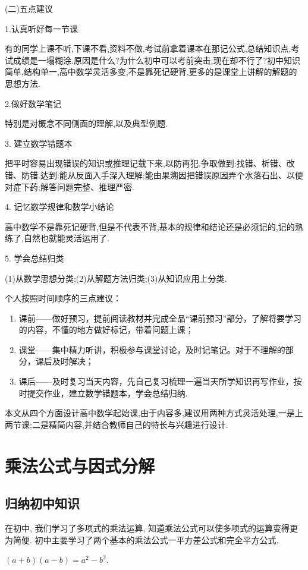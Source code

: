 (二)五点建议

1.认真听好每一节课

有的同学上课不听,下课不看,资料不做,考试前拿着课本在那记公式,总结知识点,考试成绩是一塌糊涂.原因是什么?为什么初中可以考前突击,现在却不行了?初中知识简单,结构单一,高中数学灵活多变,不是靠死记硬背,更多的是课堂上讲解的解题的思想方法.

2.做好数学笔记

特别是对概念不同侧面的理解,以及典型例题.

3. 建立数学错题本

把平时容易出现错误的知识或推理记载下来,以防再犯.争取做到:找错、析错、改错、防错.达到:能从反面入手深入理解;能由果溯因把错误原因弄个水落石出、以便对症下药;解答问题完整、推理严密.

4. 记忆数学规律和数学小结论

高中数学不是靠死记硬背,但是不代表不背,基本的规律和结论还是必须记的,记的熟练了,自然也就能灵活运用了.

5. 学会总结归类

(1)从数学思想分类;(2)从解题方法归类;(3)从知识应用上分类.

\begin{note}
	个人按照时间顺序的三点建议：
	\begin{enumerate}
		\item     课前——做好预习，提前阅读教材并完成全品“课前预习”部分，了解将要学习的内容，不懂的地方做好标记，带着问题上课；
		\item 课堂——集中精力听讲，积极参与课堂讨论，及时记笔记。对于不理解的部分，课后及时解决；
		\item 课后——及时复习当天内容，先自己复习梳理一遍当天所学知识再写作业，按时提交作业，建立数学错题本，学会总结归纳.
	\end{enumerate}
\end{note}

本文从四个方面设计高中数学起始课,由于内容多,建议用两种方式灵活处理,一是上两节课;二是精简内容,并结合教师自己的特长与兴趣进行设计.

\section{乘法公式与因式分解}
\subsection{归纳初中知识}
在初中, 我们学习了多项式的乘法运算, 知道乘法公式可以使多项式的运算变得更为简便. 初中主要学习了两个基本的乘法公式一平方差公式和完全平方公式.
\begin{formula}[平方差公式]
	$(a+b)(a-b) = a^2-b^2$.
\end{formula}

